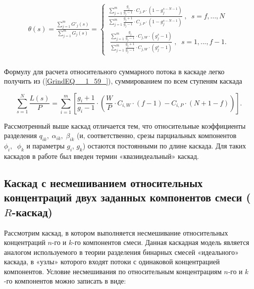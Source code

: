 \begin{equation} \label{GrindEQ__1_61_} 
  \begin{array}{l} {\theta (s)=\frac{\sum _{j=1}^{m}G'_{j} (s) }{\sum _{j=1}^{m}G_{j} (s) } =\left\{\begin{array}{l} {\frac{\sum _{j=1}^{m}\frac{g_{j} }{g_{j} -1} \cdot C_{j,P} \cdot \left(1-g_{j}^{s-N-1} \right) }{\sum _{j=1}^{m}\frac{g_{j} +1}{g_{j} -1} \cdot C_{j,P} \cdot \left(1-g_{j}^{s-N-1} \right)} \; ,\; \; s=f,...,N} \\ {\; \frac{\sum _{j=1}^{m}\frac{g_{j} }{g_{j} -1} \cdot C_{j,W} \cdot \left(g_{j}^{s} -1\right) }{\sum _{j=1}^{m}\frac{g_{j} +1}{g_{j} -1} \cdot C_{j,W} \cdot \left(g_{j}^{s} -1\right)} \; ,\; \; s=1,...,f-1.} \end{array}\right. } \\ {\; } \end{array} 
\end{equation}

Формулу для расчета относительного суммарного потока в каскаде легко получить из (\ref{GrindEQ__1_59_}), суммированием по всем ступеням каскада

\begin{equation} \label{GrindEQ__1_62_} 
  \sum _{s=1}^{N}\frac{L(s)}{P} =\sum _{i=1}^{m}\left [\frac{g_{i} +1}{g_{i} -1} \cdot \left(\frac{W}{P} \cdot C_{i,W} \cdot (f-1)-C_{i,P} \cdot \left(N+1-f\right)\right)\right ]   .   
\end{equation} 
  
Рассмотренный выше каскад отличается тем, что относительные коэффициенты разделения $q_{ik} ,\; \alpha _{ik} ,\; \beta _{ik} $ (и, соответственно, срезы парциальных компонентов $\phi _{i} ,\; \; \phi _{k} $ и параметры $g_{i} $, $g_{k} $) остаются постоянными по длине каскада. Для таких каскадов в работе \cite{sazykinKvaziidealnyeKaskadyDlya2000} был введен термин «квазиидеальный» каскад.

\subsection{Каскад с несмешиванием относительных концентраций двух заданных компонентов смеси ($R$-каскад)}\label{R_cas}

Рассмотрим каскад, в котором выполняется несмешивание относительных концентраций $n$-го и $k$-го компонентов смеси. Данная каскадная модель является аналогом используемого в теории разделения бинарных смесей «идеального» каскада, в «узлы» которого входят потоки с одинаковой концентрацией компонентов. Условие несмешивания по относительным концентрациям $n$-го и $k$-го компонентов можно записать в виде:

